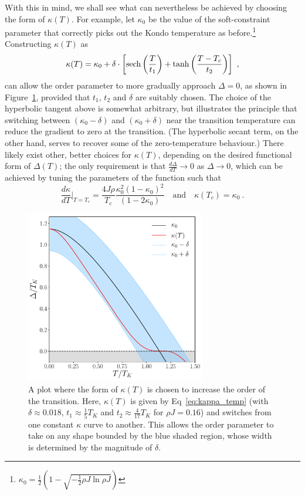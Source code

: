 With this in mind, we shall see what can nevertheless be achieved by choosing the form of $ \kappa (T) $. For example, let $ \kappa_0 $ be the value of the soft-constraint parameter that correctly picks out the Kondo temperature as before.\footnote{$ \kappa_0 = \frac{1}{2} \left( 1 - \sqrt{- \frac{1}{2} \rho J \ln{\rho J}} \right) $} Constructing $ \kappa(T) $ as
\begin{equation}
\kappa(T) = \kappa_0 + \delta \cdot \left[ \operatorname{sech}{\left( \frac{T}{t_1} \right)} + \tanh{\left( \frac{T - T_c}{t_2} \right)} \right] ~,
\end{equation}
can allow the order parameter to more gradually approach $ \Delta = 0$, as shown in Figure~\ref{fig:delta_smooth}, provided that $ t_1 $, $ t_2 $ and $ \delta $ are suitably chosen. The choice of the hyperbolic tangent above is somewhat arbitrary, but illustrates the principle that switching between $ (\kappa_0 - \delta) $ and $ (\kappa_0 + \delta) $ near the transition temperature can reduce the gradient to zero at the transition. (The hyperbolic secant term, on the other hand, serves to recover some of the zero-temperature behaviour.) There likely exist other, better choices for $ \kappa(T) $, depending on the desired functional form of $ \Delta(T) $; the only requirement is that $ \frac{d \Delta}{d T} \rightarrow 0 $ as $ \Delta \rightarrow 0 $, which can be achieved by tuning the parameters of the function such that 
\begin{equation}
\frac{d \kappa}{d T} \Bigr|_{T = T_c} = \frac{4 J \rho}{T_c} \frac{\kappa^2_0 (1 - \kappa_0)^2}{(1 - 2 \kappa_0)} \quad \text{and} \quad \kappa(T_c) = \kappa_0 ~ .
\end{equation}

\begin{figure}
\centering
\includegraphics[width=0.7\textwidth]{Figures/range_delta_vs_T.pdf}
\caption{A plot where the form of $ \kappa(T) $ is chosen to increase the order of the transition. Here, $ \kappa(T) $ is given by Eq~\eqref{eq:kappa_temp} (with $ \delta \approx 0.018 $, $ t_1 \approx \frac{1}{5} T_K $ and $ t_2 \approx \frac{4}{17} T_K $ for $ \rho J = 0.16 $) and switches from one constant $ \kappa $ curve to another. This allows the order parameter to take on any shape bounded by the blue shaded region, whose width is determined by the magnitude of $ \delta $.}
\label{fig:delta_smooth}
\end{figure}

